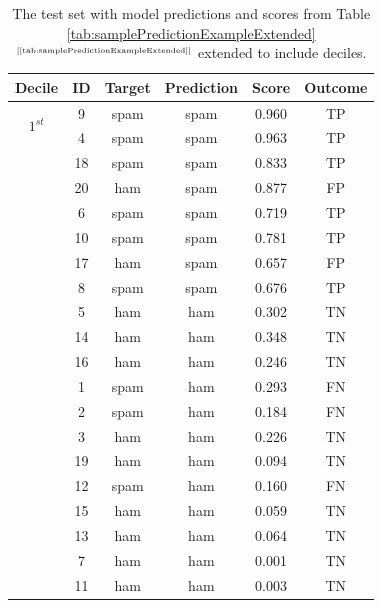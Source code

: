 \documentclass[xcolor={table}]{beamer}
\newcommand{\featN}[1]{\textsc{#1}}
\newcommand{\ourRef}[1]{\ref{#1} $^{\text{\tiny[\pageref{#1}]}}$}
\begin{document}
 \begin{frame} [plain]
\begin{table}[!tb]
\caption{The test set with model predictions and scores from Table \ourRef{tab:samplePredictionExampleExtended} extended to include deciles.}
\label{tab:samplePredictionExampleExtendedWithDeciles}
\centering
\begin{scriptsize}
\begin{tabular}{ c c  c  c  c  c }
\hline
Decile & \featN{ID}	 & Target & Prediction & Score & Outcome\\
\hline 
\multirow{2}{*}{ $1^{st}$} & 9	&	spam	&	spam	&	0.960	&	TP	\\
 & 4	&	spam	&	spam	&	0.963	&	TP	\\
 \hdashline
 \multirow{2}{*}{ $2^{nd}$} & 18	&	spam	&	spam	&	0.833	&	TP	\\
 & 20	&	ham	&	spam	&	0.877	&	FP	\\
\hdashline
\multirow{2}{*}{ $3^{rd}$} & 6	&	spam	&	spam	&	0.719	&	TP	\\
 & 10	&	spam	&	spam	&	0.781	&	TP	\\
 \hdashline
\multirow{2}{*}{ $4^{th}$} & 17	&	ham	&	spam	&	0.657	&	FP	\\
 & 8	&	spam	&	spam	&	0.676	&	TP	\\
 \hdashline
\multirow{2}{*}{ $5^{th}$} & 5	&	ham	&	ham	&	0.302	&	TN	\\
 & 14	&	ham	&	ham	&	0.348	&	TN	\\
 \hdashline
\multirow{2}{*}{ $6^{th}$} & 16	&	ham	&	ham	&	0.246	&	TN	\\
 & 1	&	spam	&	ham	&	0.293	&	FN	\\
 \hdashline
\multirow{2}{*}{ $7^{th}$} & 2	&	spam	&	ham	&	0.184	&	FN	\\
 & 3	&	ham	&	ham	&	0.226	&	TN	\\
 \hdashline
\multirow{2}{*}{ $8^{th}$} & 19	&	ham	&	ham	&	0.094	&	TN	\\
 & 12	&	spam	&	ham	&	0.160	&	FN	\\
 \hdashline
\multirow{2}{*}{ $9^{th}$} & 15	&	ham	&	ham	&	0.059	&	TN	\\
 & 13	&	ham	&	ham	&	0.064	&	TN	\\
 \hdashline
\multirow{2}{*}{ $10^{th}$} & 7	&	ham	&	ham	&	0.001	&	TN	\\
 & 11	&	ham	&	ham	&	0.003	&	TN	\\
\hline 
\end{tabular}
\end{scriptsize}
\end{table}
\end{frame} 
\end{document}
